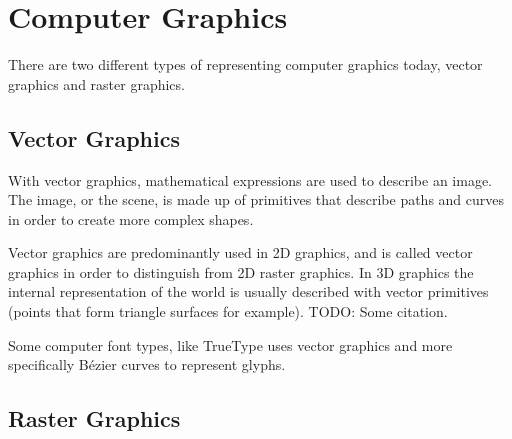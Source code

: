 \section{Computer Graphics}
There are two different types of representing computer graphics today, vector graphics and raster graphics.


\subsection{Vector Graphics}
With vector graphics, mathematical expressions are used to describe an image.
The image, or the scene, is made up of primitives that describe paths and curves in order to create more complex shapes.

Vector graphics are predominantly used in 2D graphics, and is called vector graphics in order to distinguish from 2D raster graphics.
In 3D graphics the internal representation of the world is usually described with vector primitives (points that form triangle surfaces for example).
TODO: Some citation.

Some computer font types, like TrueType uses vector graphics and more specifically Bézier curves to represent glyphs\cite{truetype}.

\subsection{Raster Graphics}
